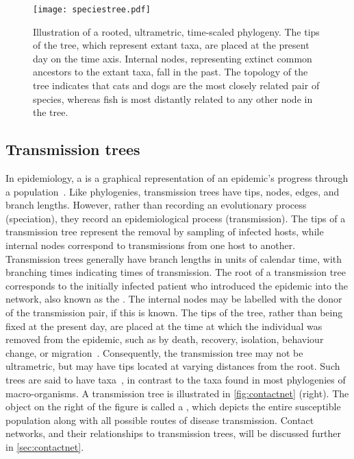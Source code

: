 \begin{figure}[ht]
  \centering
  \texttt{[image: speciestree.pdf]}
  \caption[Illustration of a rooted, ultrametric, time-scaled phylogeny.]
    {Illustration of a rooted, ultrametric, time-scaled phylogeny. The tips of
      the tree, which represent extant taxa, are placed at the present day on
      the time axis. Internal nodes, representing extinct common ancestors to
      the extant taxa, fall in the past. The topology of the tree indicates
      that cats and dogs are the most closely related pair of species, whereas
      fish is most distantly related to any other node in the tree.}
  \label{fig:speciestree}
\end{figure}

\subsection{Transmission trees}

In epidemiology, a  is a graphical representation of an
epidemic's progress through a population~\autocite{ypma2013relating}. Like
phylogenies, transmission trees have tips, nodes, edges, and branch lengths.
However, rather than recording an evolutionary process (speciation), they
record an epidemiological process (transmission). The tips of a transmission
tree represent the removal by sampling of infected hosts, while internal nodes
correspond to transmissions from one host to another. Transmission trees
generally have branch lengths in units of calendar time, with branching times
indicating times of transmission. The root of a transmission tree corresponds
to the initially infected patient who introduced the epidemic into the network,
also known as the . The internal nodes may be labelled with
the donor of the transmission pair, if this is known. The tips of the tree,
rather than being fixed at the present day, are placed at the time at which the
individual was removed from the epidemic, such as by death, recovery,
isolation, behaviour change, or migration~\autocite{stadler2013uncovering}.
Consequently, the transmission tree may not be ultrametric, but may have tips
located at varying distances from the root. Such trees are said to have
 taxa~\autocite{drummond2003measurably}, in contrast to
the  taxa found in most phylogenies of macro-organisms. A
transmission tree is illustrated in \cref{fig:contactnet} (right). 
The object on the right of the figure is called a , which depicts the entire susceptible population along with all
possible routes of disease transmission. Contact networks, and their
relationships to transmission trees, will be discussed further in
\cref{sec:contactnet}.

